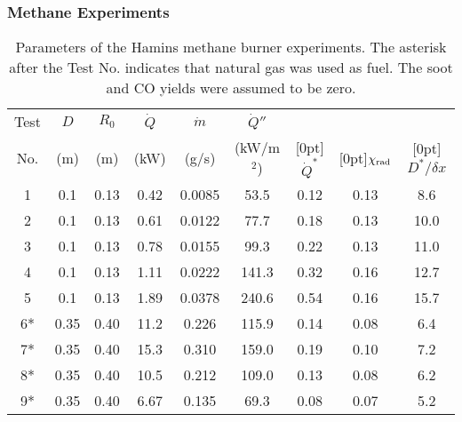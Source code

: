 \newpage

\subsubsection{Methane Experiments}

\begin{table}[!ht]
\caption[Parameters of the Hamins methane burner experiments]{Parameters of the Hamins methane burner experiments. The asterisk after the Test No. indicates that natural gas was used as fuel. The soot and CO yields were assumed to be zero.}
\begin{center}
\begin{tabular}{|c|c|c|c|c|c|c||c|c|}
\hline
Test      & $D$      & $R_0$      & $\dot{Q}$   &  $\dot{m}$            &  $\dot{Q}''$   &               &            &          \\
No.       & (m)      & (m)        & (kW)        &  (g/s)                &  (kW/m$^2$)    & \raisebox{1.5ex}[0pt]{$\dot{Q}^*$} & \raisebox{1.5ex}[0pt]{$\chi_{\rm rad}$} & \raisebox{1.5ex}[0pt]{$D^*/\delta x$} \\ \hline \hline
1         & 0.1      & 0.13       & 0.42        &  0.0085               &  53.5          & 0.12          & 0.13       & 8.6     \\ \hline
2         & 0.1      & 0.13       & 0.61        &  0.0122               &  77.7          & 0.18          & 0.13       & 10.0     \\ \hline
3         & 0.1      & 0.13       & 0.78        &  0.0155               &  99.3          & 0.22          & 0.13       & 11.0     \\ \hline
4         & 0.1      & 0.13       & 1.11        &  0.0222               &  141.3         & 0.32          & 0.16       & 12.7      \\ \hline
5         & 0.1      & 0.13       & 1.89        &  0.0378               &  240.6         & 0.54          & 0.16       & 15.7      \\ \hline
6*        & 0.35     & 0.40       & 11.2        &  0.226                &  115.9         & 0.14          & 0.08       & 6.4      \\ \hline
7*        & 0.35     & 0.40       & 15.3        &  0.310                &  159.0         & 0.19          & 0.10       & 7.2      \\ \hline
8*        & 0.35     & 0.40       & 10.5        &  0.212                &  109.0         & 0.13          & 0.08       & 6.2      \\ \hline
9*        & 0.35     & 0.40       & 6.67        &  0.135                &  69.3          & 0.08          & 0.07       & 5.2      \\ \hline

\end{tabular}
\end{center}
\end{table}
